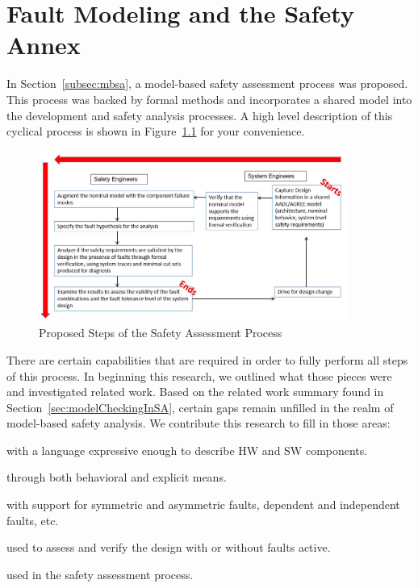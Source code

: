 \chapter{Fault Modeling and the Safety Annex}
\label{chap:faultModeling}
In Section~\ref{subsec:mbsa}, a model-based safety assessment process was proposed. This process was backed by formal methods and incorporates a shared model into the development and safety analysis processes. A high level description of this cyclical process is shown in Figure~\ref{fig:SACycle} for your convenience. 

\begin{figure}[h]
	\begin{center}
		\includegraphics[width=0.9\textwidth]{images/process4.jpg}
	\end{center}
	\caption{Proposed Steps of the Safety Assessment Process}
	\label{fig:SACycle}
\end{figure}

There are certain capabilities that are required in order to fully perform all steps of this process. In beginning this research, we outlined what those pieces were and investigated related work. Based on the related work summary found in Section~\ref{sec:modelCheckingInSA}, certain gaps remain unfilled in the realm of model-based safety analysis. We contribute this research to fill in those areas:

\begin{description}[nosep]

    \item[Shared model] with a language expressive enough to describe HW and SW components.
    \item[Flexible error propagations] through both behavioral and explicit means.
    \item[Flexible fault modeling] with support for symmetric and asymmetric faults, dependent and independent faults, etc.
    \item[Model checker] used to assess and verify the design with or without faults active.
    \item[Ability to generate artifacts] used in the safety assessment process.
\end{description}

